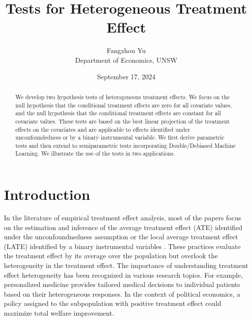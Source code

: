 \documentclass[
  12pt,
  12pt]{article}
\numberwithin{equation}{section}
\theoremstyle{definition}
\theoremstyle{plain}
\theoremstyle{plain}
\theoremstyle{remark}
\begin{document}
\def\spacingset#1{\renewcommand{\baselinestretch}%
{#1}\small\normalsize} \spacingset{1}



\date{September 17, 2024}
\title{\bf Tests for Heterogeneous Treatment Effect}
\author{
Fangzhou Yu\\
Department of Economics, UNSW\\
}
\maketitle

\bigskip
\bigskip
\begin{abstract}
We develop two hypothesis tests of heterogeneous treatment effects. We
focus on the null hypothesis that the conditional treatment effects are
zero for all covariate values, and the null hypothesis that the
conditional treatment effects are constant for all covariate values.
These tests are based on the best linear projection of the treatment
effects on the covariates and are applicable to effects identified under
unconfoundedness or by a binary instrumental variable. We first derive
parametric tests and then extend to semiparametric tests incorporating
Double/Debiased Machine Learning. We illustrate the use of the tests in
two applications.
\end{abstract}


\newpage
\spacingset{1.9} %

\section{Introduction}\label{sec-intro}

In the literature of empirical treatment effect analysis, most of the
papers focus on the estimation and inference of the average treatment
effect (ATE) identified under the unconfoundnedness assumption or the
local average treatment effect (LATE) identified by a binary
instrumental variables \citep{angrist1995identification}. These
practices evaluate the treatment effect by its average over the
population but overlook the heterogeneity in the treatment effect. The
importance of understanding treatment effect heterogeneity has been
recognized in various research topics. For example, personalized
medicine provides tailored medical decisions to individual patients
based on their heterogeneous responses. In the context of political
economics, a policy assigned to the subpopulation with positive
treatment effect could maximize total welfare improvement.
\end{document}
